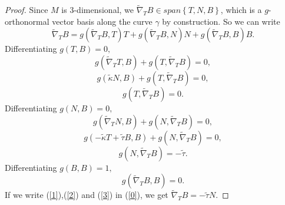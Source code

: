 \documentclass[10pt,a4paper]{amsart}
\begin{document}
\begin{proof}
Since $M$ is $3$-dimensional, we $\widetilde{\nabla }_{T}B\in span\left\{
T,N,B\right\} $, which is a $g$-orthonormal vector basis along the curve $%
\gamma $ by construction. So we can write%
\begin{equation}
\widetilde{\nabla }_{T}B=g\left( \widetilde{\nabla }_{T}B,T\right) T+g\left( 
\widetilde{\nabla }_{T}B,N\right) N+g\left( \widetilde{\nabla }%
_{T}B,B\right) B.  \label{0}
\end{equation}%
Differentiating $g\left( T,B\right) =0,$%
\begin{equation*}
g\left( \widetilde{\nabla }_{T}T,B\right) +g\left( T,\widetilde{\nabla }%
_{T}B\right) =0,
\end{equation*}%
\begin{equation*}
g\left( \widetilde{\kappa }N,B\right) +g\left( T,\widetilde{\nabla }%
_{T}B\right) =0,
\end{equation*}%
\begin{equation}
g\left( T,\widetilde{\nabla }_{T}B\right) =0.  \label{1}
\end{equation}%
Differentiating $g\left( N,B\right) =0,$%
\begin{equation*}
g\left( \widetilde{\nabla }_{T}N,B\right) +g\left( N,\widetilde{\nabla }%
_{T}B\right) =0,
\end{equation*}%
\begin{equation*}
g\left( -\widetilde{\kappa }T+\widetilde{\tau }B,B\right) +g\left( N,%
\widetilde{\nabla }_{T}B\right) =0,
\end{equation*}%
\begin{equation}
g\left( N,\widetilde{\nabla }_{T}B\right) =-\widetilde{\tau }.  \label{2}
\end{equation}%
Differentiating $g\left( B,B\right) =1,$%
\begin{equation}
g\left( \widetilde{\nabla }_{T}B,B\right) =0.  \label{3}
\end{equation}%
If we write (\ref{1}),(\ref{2}) and (\ref{3}) in (\ref{0}), we get $%
\widetilde{\nabla }_{T}B=-\widetilde{\tau }N.$
\end{proof}
\end{document}
